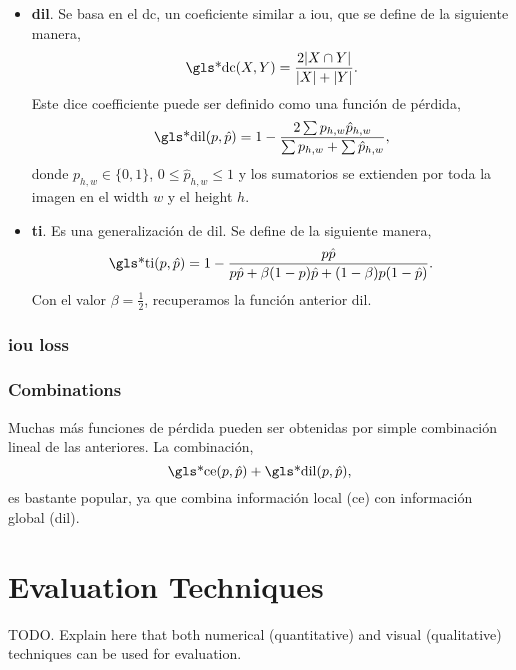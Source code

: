 \begin{itemize}
  \item \textbf{\gls*{dil}}. Se basa en el \gls{dc}, un coeficiente similar a
  \gls{iou}, que se define de la siguiente manera,
  \begin{equation}
    \text{\gls*{dc}}(X, Y) = \frac{2|X \cap Y|}{|X| + |Y|}.
  \end{equation}
  Este dice coefficiente puede ser definido como una función de pérdida,
  \begin{equation}
    \text{\gls*{dil}}(p, \hat{p})
    = 1 - \frac{2\sum p_{h, w}\hat{p}_{h, w}}{\sum p_{h, w} + \sum \hat{p}_{h, w}},
  \end{equation}
  donde \(p_{h, w} \in \{0, 1\}\), \(0 \leq \hat{p}_{h, w} \leq 1\) y los
  sumatorios se extienden por toda la imagen en el width \(w\) y el height
  \(h\).
  \item \textbf{\gls*{ti}}. Es una generalización de \gls{dil}. Se define de la
  siguiente manera,
  \begin{equation}
    \text{\gls*{ti}}(p, \hat{p})
    = 1 - \frac{p\hat{p}}{p\hat{p} + \beta(1 - p)\hat{p} + (1 - \beta)p(1 - \hat{p})}.
  \end{equation}
  Con el valor \(\beta = \frac{1}{2}\), recuperamos la función anterior
  \gls{dil}.
\end{itemize}


\subsubsection{\gls*{iou} loss}

\cite{yu16:unitb}

\subsubsection{Combinations}
Muchas más funciones de pérdida pueden ser obtenidas por simple combinación
lineal de las anteriores. La combinación,
\begin{equation}
  \text{\gls*{ce}}(p, \hat{p}) + \text{\gls*{dil}}(p, \hat{p}),
\end{equation}
es bastante popular, ya que combina información local (\gls{ce}) con
información global (\gls{dil}).


\section{Evaluation Techniques}\label{sec:eval-measure}

TODO. Explain here that both numerical (quantitative) and visual (qualitative)
techniques can be used for evaluation.

